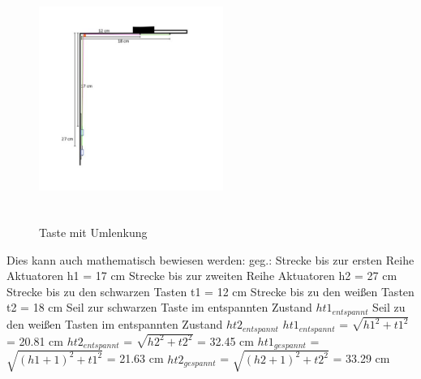 \begin{figure}[htbp]
	\centering
	\includegraphics[width=6cm, height=8cm]{img/mitUmlenkung_locker}
	\caption{Taste mit Umlenkung}
\end{figure}


Dies kann auch mathematisch bewiesen werden:
\newline geg.: %
\newline Strecke bis zur ersten Reihe Aktuatoren h1 = 17 cm %
\newline Strecke bis zur zweiten Reihe Aktuatoren h2 = 27 cm
\newline Strecke bis zu den schwarzen Tasten t1 = 12 cm
\newline Strecke bis zu den weißen Tasten t2 = 18 cm
\newline Seil zur schwarzen Taste im entspannten Zustand $ht1_{entspannt}$ %
\newline Seil zu den weißen Tasten im entspannten Zustand $ht2_{entspannt}$
\newline $ht1_{entspannt}$ = $\sqrt {h1^{2} + t1^{2}}$ = 20.81 cm
\newline $ht2_{entspannt}$ = $\sqrt {h2^{2} + t2^{2}}$ = 32.45 cm
\newline $ht1_{gespannt}$ = $\sqrt {(h1 + 1) ^{2} + t1^{2}}$ = 21.63 cm
\newline $ht2_{gespannt}$ = $\sqrt {(h2 + 1)^{2} + t2^{2}}$ = 33.29 cm

